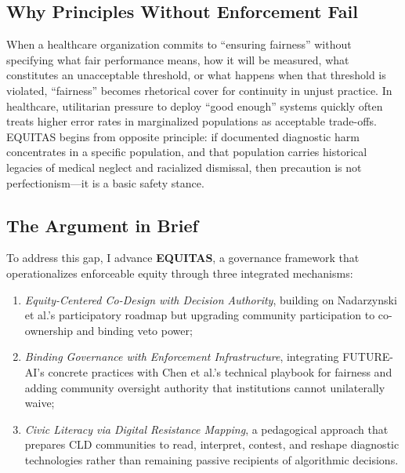 \documentclass[12pt,a4paper]{article}
\begin{document}
\subsection{Why Principles Without Enforcement Fail}

When a healthcare organization commits to ``ensuring fairness'' without specifying what fair performance means, how it will be measured, what constitutes an unacceptable threshold, or what happens when that threshold is violated, ``fairness'' becomes rhetorical cover for continuity in unjust practice. In healthcare, utilitarian pressure to deploy ``good enough'' systems quickly often treats higher error rates in marginalized populations as acceptable trade-offs. EQUITAS begins from opposite principle: if documented diagnostic harm concentrates in a specific population, and that population carries historical legacies of medical neglect and racialized dismissal, then precaution is not perfectionism—it is a basic safety stance.\cite{garcia_ed415}

\subsection{The Argument in Brief}

To address this gap, I advance \textbf{EQUITAS}, a governance framework that operationalizes enforceable equity through three integrated mechanisms:

\begin{enumerate}
    \setlength\itemsep{0.1em}
    \item \textit{Equity-Centered Co-Design with Decision Authority}, building on Nadarzynski et al.'s participatory roadmap but upgrading community participation to co-ownership and binding veto power;\cite{nadarzynski2024}
    
    \item \textit{Binding Governance with Enforcement Infrastructure}, integrating FUTURE-AI's concrete practices \cite{lekadir2025} with Chen et al.'s technical playbook for fairness \cite{chen2023} and adding community oversight authority that institutions cannot unilaterally waive;
    
    \item \textit{Civic Literacy via Digital Resistance Mapping}, a pedagogical approach that prepares CLD communities to read, interpret, contest, and reshape diagnostic technologies rather than remaining passive recipients of algorithmic decisions.
\end{enumerate}
\end{document}
